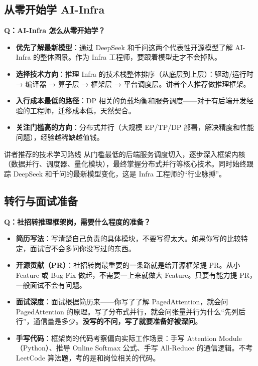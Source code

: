 \documentclass[a4paper]{article}
\begin{document}
\subsection{从零开始学 AI-Infra}

\textbf{Q：AI-Infra 怎么从零开始学？}

\begin{itemize}
    \item \textbf{优先了解最新模型}：通过 DeepSeek 和千问这两个代表性开源模型了解 AI-Infra 的整体图景。作为 Infra 工程师，要跟着模型走才不会掉队。
    \item \textbf{选择技术方向}：推理 Infra 的技术栈整体排序（从底层到上层）：驱动/运行时 → 编译器 → 算子层 → 框架层 → 平台调度层。讲者个人推荐做推理框架。
    \item \textbf{入行成本最低的路径}：DP 相关的负载均衡和服务调度——对于有后端开发经验的工程师，迁移成本低，天然契合。
    \item \textbf{关注门槛高的方向}：分布式并行（大规模 EP/TP/DP 部署，解决精度和性能问题），经验越稀缺越值钱。
\end{itemize}

\begin{knowledgebox}{讲者推荐的技术学习路线}
    从门槛最低的后端服务调度切入，逐步深入框架内核（数据并行、调度器、量化模块），最终掌握分布式并行等核心技术。同时始终跟踪 DeepSeek 和千问的最新模型变化，这是 Infra 工程师的``行业脉搏''。
\end{knowledgebox}

\subsection{转行与面试准备}

\textbf{Q：社招转推理框架岗，需要什么程度的准备？}

\begin{itemize}
    \item \textbf{简历写法}：写清楚自己负责的具体模块，不要写得太大。如果你写的比较特定，面试官不会多问你没写过的东西。
    \item \textbf{开源贡献（PR）}：社招转岗最重要的一条路就是给开源框架提 PR。从小 Feature 或 Bug Fix 做起，不需要一上来就做大 Feature。只要有能力提 PR，一般面试不会有问题。
    \item \textbf{面试深度}：面试根据简历来——你写了了解 PagedAttention，就会问 PagedAttention 的原理。写了分布式并行，就会问张量并行为什么``先列后行''，通信量是多少。\textbf{没写的不问，写了就要准备好被深问}。
    \item \textbf{手写代码}：框架岗的代码考察偏向实际工作场景：手写 Attention Module（Python）、推导 Online Softmax 公式、手写 All-Reduce 的通信逻辑。不考 LeetCode 算法题，考的是和岗位相关的代码。
\end{itemize}
\end{document}
